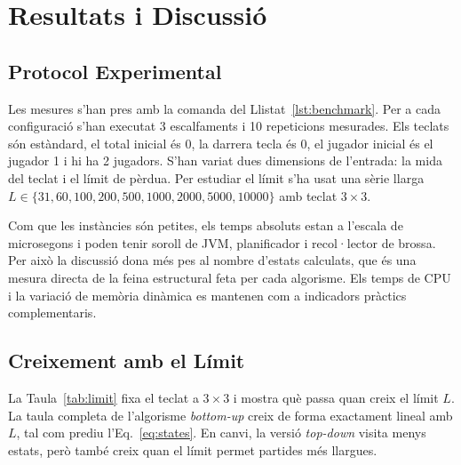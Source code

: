 \documentclass[conference,compsoc]{IEEEtran}
\begin{document}
\section{Resultats i Discussió}
\label{sec:resultats}

\subsection{Protocol Experimental}

Les mesures s'han pres amb la comanda del Llistat~\ref{lst:benchmark}. Per a
cada configuració s'han executat 3 escalfaments i 10 repeticions mesurades. Els
teclats són estàndard, el total inicial és $0$, la darrera tecla és $0$, el
jugador inicial és el jugador 1 i hi ha 2 jugadors. S'han variat dues dimensions
de l'entrada: la mida del teclat i el límit de pèrdua. Per estudiar el límit
s'ha usat una sèrie llarga
$L\in\{31,60,100,200,500,1000,2000,5000,10000\}$ amb teclat $3\times3$.

Com que les instàncies són petites, els temps absoluts estan a l'escala de
microsegons i poden tenir soroll de JVM, planificador i recol·lector de brossa.
Per això la discussió dona més pes al nombre d'estats calculats, que és una
mesura directa de la feina estructural feta per cada algorisme. Els temps de CPU i
la variació de memòria dinàmica es mantenen com a indicadors pràctics complementaris.

\subsection{Creixement amb el Límit}

La Taula~\ref{tab:limit} fixa el teclat a $3\times3$ i mostra què passa quan
creix el límit $L$. La taula completa de l'algorisme \textit{bottom-up} creix de
forma exactament lineal amb $L$, tal com prediu l'Eq.~\ref{eq:states}. En canvi,
la versió \textit{top-down} visita menys estats, però també creix quan el límit
permet partides més llargues.
\end{document}
